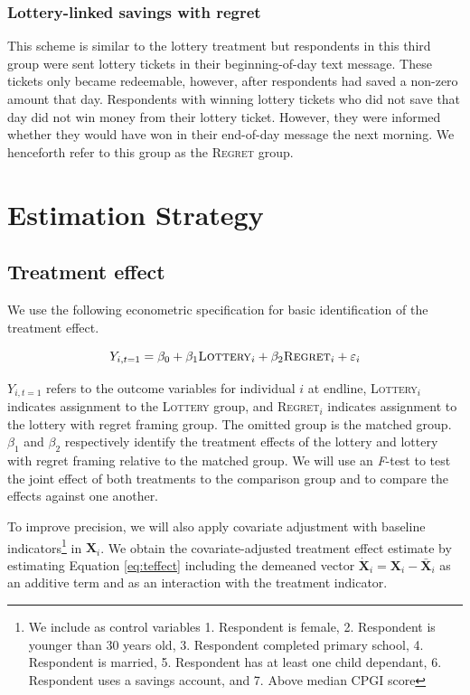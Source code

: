 \documentclass[11pt]{article}
\begin{document}
			\subsubsection{Lottery-linked savings with regret}

				This scheme is similar to the lottery treatment but respondents in this third group were sent lottery tickets in their beginning-of-day text message. These tickets only became redeemable, however, after respondents had saved a non-zero amount that day. Respondents with winning lottery tickets who did not save that day did not win money from their lottery ticket. However, they were informed whether they would have won in their end-of-day message the next morning. We henceforth refer to this group as the \textsc{Regret} group.

\section{Estimation Strategy} \label{sec:est}

	\subsection{Treatment effect}

		We use the following econometric specification for basic identification of the treatment effect.

		\begin{equation} \label{eq:teffect}
			Y_{i,t=1} = \beta_{0} + \beta_{1}\text{\textsc{Lottery}}_{i} + \beta_{2}\text{\textsc{Regret}}_{i} + \varepsilon_{i}
		\end{equation}

		$Y_{i,t=1}$ refers to the outcome variables for individual $i$ at endline, \textsc{Lottery}$_i$ indicates assignment to the \textsc{Lottery} group, and \textsc{Regret}$_i$ indicates assignment to the lottery with regret framing group. The omitted group is the matched group. $\beta_{1}$ and $\beta_{2}$ respectively identify the treatment effects of the lottery and lottery with regret framing relative to the matched group. We will use an \emph{F}-test to test the joint effect of both treatments to the comparison group and to compare the effects against one another.

		To improve precision, we will also apply covariate adjustment with baseline indicators\footnote{We include as control variables 1. Respondent is female, 2. Respondent is younger than 30 years old, 3. Respondent completed primary school, 4. Respondent is married, 5. Respondent has at least one child dependant, 6. Respondent uses a savings account, and 7. Above median CPGI score} in $\mathbf{X}_i$. We obtain the covariate-adjusted treatment effect estimate by estimating Equation \ref{eq:teffect} including the demeaned vector $\mathbf{\dot X}_{i} = \mathbf{X}_{i} - \mathbf{\bar X}_{i}$ as an additive term and as an interaction with the treatment indicator.
\end{document}
